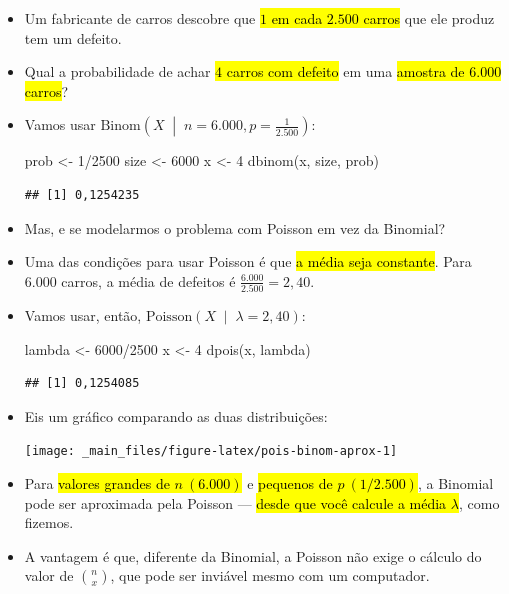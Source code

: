 \documentclass[
  11pt]{report}
\newenvironment{Shaded}{\begin{snugshade}}{\end{snugshade}}
\newcommand{\DecValTok}[1]{\textcolor[rgb]{0.00,0.00,0.81}{#1}}
\newcommand{\FunctionTok}[1]{\textcolor[rgb]{0.00,0.00,0.00}{#1}}
\newcommand{\NormalTok}[1]{#1}
\newcommand{\OtherTok}[1]{\textcolor[rgb]{0.56,0.35,0.01}{#1}}
\newcommand{\SpecialCharTok}[1]{\textcolor[rgb]{0.00,0.00,0.00}{#1}}
\renewenvironment{Shaded}{
    \begin{mdframed}[%
      roundcorner=2pt,%
      innerleftmargin=5pt,%
      innerrightmargin=5pt,%
      topline=true,%
      leftline=true,%
      rightline=true,%
      bottomline=true,%
      linewidth=0.5pt,%
      linecolor=black!20,%
      backgroundcolor=black!2,%
      skipabove=2ex,%
      skipbelow=2.5ex%
    ]%
  }
  {
    \end{mdframed}
  }
\begin{document}
\begin{itemize}
\item
  Um fabricante de carros descobre que {\hl{$1$ em cada $2.500$ carros}} que ele produz tem um defeito.
\item
  Qual a probabilidade de achar {\hl{$4$ carros com defeito}} em uma {\hl{amostra de $6.000$ carros}}?
\item
  Vamos usar $\text{Binom}\left(X \;\middle\vert\;n = 6.000, p = \frac{1}{2.500}\right)$:

\begin{Shaded}
\begin{Highlighting}[]
\NormalTok{prob }\OtherTok{\textless{}{-}} \DecValTok{1}\SpecialCharTok{/}\DecValTok{2500}
\NormalTok{size }\OtherTok{\textless{}{-}} \DecValTok{6000}
\NormalTok{x }\OtherTok{\textless{}{-}} \DecValTok{4}
\FunctionTok{dbinom}\NormalTok{(x, size, prob)}
\end{Highlighting}
\end{Shaded}

\begin{verbatim}
## [1] 0,1254235
\end{verbatim}
\item
  Mas, e se modelarmos o problema com Poisson em vez da Binomial?
\item
  Uma das condições para usar Poisson é que {\hl{a média seja constante}}. Para $6.000$ carros, a média de defeitos é $\frac{6.000}{2.500} = 2{,}40$.
\item
  Vamos usar, então, $\text{Poisson}\left(X \;\middle\vert\; \lambda = 2{,}40 \right)$:

\begin{Shaded}
\begin{Highlighting}[]
\NormalTok{lambda }\OtherTok{\textless{}{-}} \DecValTok{6000}\SpecialCharTok{/}\DecValTok{2500}
\NormalTok{x }\OtherTok{\textless{}{-}} \DecValTok{4}
\FunctionTok{dpois}\NormalTok{(x, lambda)}
\end{Highlighting}
\end{Shaded}

\begin{verbatim}
## [1] 0,1254085
\end{verbatim}
\item
  Eis um gráfico comparando as duas distribuições:

  \begin{center}\texttt{[image: \_main\_files/figure-latex/pois-binom-aprox-1]} \end{center}
\item
  Para {\hl{valores grandes de $n~(6.000)$}} e {\hl{pequenos de $p~(1/2.500)$}}, a Binomial pode ser aproximada pela Poisson --- {\hl{desde que você calcule a média $\lambda$}}, como fizemos.
\item
  A vantagem é que, diferente da Binomial, a Poisson não exige o cálculo do valor de $n \choose x$, que pode ser inviável mesmo com um computador.
\end{itemize}
\end{document}
